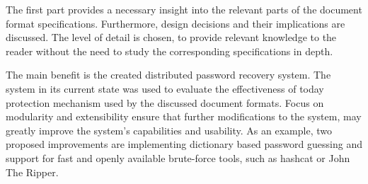 \documentclass[11pt,oneside]{fithesis2}
\begin{document}
The first part provides a necessary insight into the relevant parts of the document format specifications. Furthermore, design decisions and their implications are discussed. The level of detail is chosen, to provide relevant knowledge to the reader without the need to study the corresponding specifications in depth.

The main benefit is the created distributed password recovery system. The system in its current state was used to evaluate the effectiveness of today protection mechanism used by the discussed document formats. Focus on modularity and extensibility ensure that further modifications to the system, may greatly improve the system's capabilities and usability. As an example, two proposed improvements are implementing dictionary based password guessing and support for fast and openly available brute-force tools, such as hashcat or John The Ripper.

 

\end{document}

